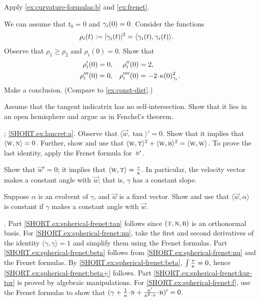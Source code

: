 \begin{multicols}{2}
 Apply \ref{ex:curvature-formulas:b} and \ref{ex:frenet}.

We can assume that $t_0=0$ and $\gamma_i(0)\z=0$.
Consider the functions
\begin{align*}
\rho_i(t)&\mathrel{:=}|\gamma_i(t)|^2=\langle \gamma_i(t),\gamma_i(t)\rangle.
\end{align*}
Observe that $\rho_1\ge \rho_2$ and $\rho_i(0)=0$.
Show that 
\begin{align*}
\rho_i'(0)&=0,
&
\rho_i''(0)&=2,
\\
\rho_i'''(0)&=0,
&
\rho_i''''(0)&=-2\cdot\kur(0)^2_{\gamma_i}.
\end{align*}
Make a conclusion. (Compare to \ref{ex:const-dist}.)

 Assume that the tangent indicatrix has no self-intersection.
Show that it lies in an open hemisphere and argue as in Fenchel's theorem.

\parbf{\ref{ex:lancret}}; \ref{SHORT.ex:lancret:a}.
Observe that 
$\langle \vec w,\tan\rangle'=0$.
Show that it implies that $\langle \text{\sc{w}}, \text{\sc{n}}\rangle =0$.
Further, show and use that $\langle \text{\sc{w}}, \text{\sc{t}}\rangle^2+\langle \text{\sc{w}}, \text{\sc{b}}\rangle^2=\langle \text{\sc{w}}, \text{\sc{w}}\rangle$.
To prove the last identity, apply the Frenet formula for~$\text{\sc{n}}'$.

Show that $\vec w'=0$;
it implies that $\langle \vec w,\tan\rangle\z=\tfrac\tor\kur$.
In particular, the velocity vector makes a constant angle with $\vec w$; that is, $\gamma$ has a constant slope.

Suppose $\alpha$ is an evolvent of $\gamma$, and $\vec w$ is a fixed vector.
Show and use that $\langle \vec w,\alpha\rangle$ is constant if $\gamma$ makes a constant angle with $\vec w$.

\parbf{\ref{ex:spherical-frenet}}.
Part \ref{SHORT.ex:spherical-frenet:tau} follows since $(\text{\sc{t}},\text{\sc{n}},\text{\sc{b}})$ is an orthonormal basis.
For \ref{SHORT.ex:spherical-frenet:nu}, take the first and second derivatives of the identity $\langle\gamma,\gamma\rangle=1$ and simplify them using the Frenet formulas.
Part \ref{SHORT.ex:spherical-frenet:beta} follows from \ref{SHORT.ex:spherical-frenet:nu} and the Frenet formulas.
By \ref{SHORT.ex:spherical-frenet:beta}, $\int\tfrac{\tau}{\kappa}=0$, hence \ref{SHORT.ex:spherical-frenet:beta+} follows.
Part \ref{SHORT.ex:spherical-frenet:kur-tor} is proved by algebraic manipulations.
For \ref{SHORT.ex:spherical-frenet:f},
use the Frenet formulas to show that $(\gamma+\tfrac1\kur\cdot \norm+\tfrac{\kur'}{\kur^2\cdot\tor}\cdot\bi)'=0$.


\end{multicols}
